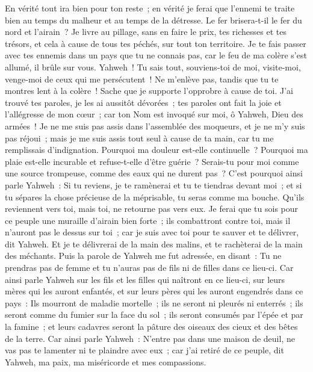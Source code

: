 \begin{multicols}{2}
En vérité tout ira bien pour ton reste~; en vérité je ferai que l'ennemi te traite bien au temps du malheur et au temps de la détresse.
Le fer brisera-t-il le fer du nord et l'airain~?
Je livre au pillage, sans en faire le prix, tes richesses et tes trésors, et cela à cause de tous tes péchés, sur tout ton territoire.
Je te fais passer avec tes ennemis dans un pays que tu ne connais pas, car le feu de ma colère s'est allumé, il brûle sur vous.
Yahweh~! Tu sais tout, souviens-toi de moi, visite-moi, venge-moi de ceux qui me persécutent~! Ne m'enlève pas, tandis que tu te montres lent à la colère~! Sache que je supporte l'opprobre à cause de toi.
J'ai trouvé tes paroles, je les ai aussitôt dévorées~; tes paroles ont fait la joie et l'allégresse de mon cœur~; car ton Nom est invoqué sur moi, ô Yahweh, Dieu des armées~!
Je ne me suis pas assis dans l'assemblée des moqueurs, et je ne m'y suis pas réjoui~; mais je me suis assis tout seul à cause de ta main, car tu me remplissais d'indignation.
Pourquoi ma douleur est-elle continuelle~? Pourquoi ma plaie est-elle incurable et refuse-t-elle d'être guérie~? Serais-tu pour moi comme une source trompeuse, comme des eaux qui ne durent pas~?
C'est pourquoi ainsi parle Yahweh~: Si tu reviens, je te ramènerai et tu te tiendras devant moi~; et si tu sépares la chose précieuse de la méprisable, tu seras comme ma bouche. Qu'ils reviennent vers toi, mais toi, ne retourne pas vers eux.
Je ferai que tu sois pour ce peuple une muraille d'airain bien forte~; ils combattront contre toi, mais il n'auront pas le dessus sur toi~; car je suis avec toi pour te sauver et te délivrer, dit Yahweh.
Et je te délivrerai de la main des malins, et te rachèterai de la main des méchants.
\VerseOne{}Puis la parole de Yahweh me fut adressée, en disant~:
Tu ne prendras pas de femme et tu n'auras pas de fils ni de filles dans ce lieu-ci.
Car ainsi parle Yahweh sur les fils et les filles qui naîtront en ce lieu-ci, sur leurs mères qui les auront enfantés, et sur leurs pères qui les auront engendrés dans ce pays~:
Ils mourront de maladie mortelle~; ils ne seront ni pleurés ni enterrés~; ils seront comme du fumier sur la face du sol~; ils seront consumés par l'épée et par la famine~; et leurs cadavres seront la pâture des oiseaux des cieux et des bêtes de la terre.
Car ainsi parle Yahweh~: N'entre pas dans une maison de deuil, ne vas pas te lamenter ni te plaindre avec eux~; car j'ai retiré de ce peuple, dit Yahweh, ma paix, ma miséricorde et mes compassions.

\end{multicols}
